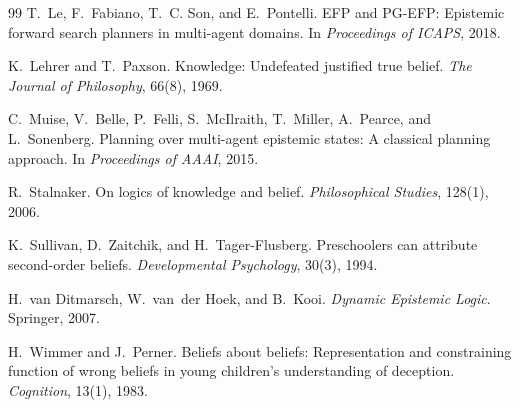 \documentclass[11pt,a4paper]{article}
\begin{document}
\begin{thebibliography}{99}
T.~Le, F.~Fabiano, T.~C. Son, and E.~Pontelli.
\newblock EFP and PG-EFP: Epistemic forward search planners in multi-agent domains.
\newblock In \emph{Proceedings of ICAPS}, 2018.

K.~Lehrer and T.~Paxson.
\newblock Knowledge: Undefeated justified true belief.
\newblock \emph{The Journal of Philosophy}, 66(8), 1969.

C.~Muise, V.~Belle, P.~Felli, S.~McIlraith, T.~Miller, A.~Pearce, and L.~Sonenberg.
\newblock Planning over multi-agent epistemic states: A classical planning approach.
\newblock In \emph{Proceedings of AAAI}, 2015.

R.~Stalnaker.
\newblock On logics of knowledge and belief.
\newblock \emph{Philosophical Studies}, 128(1), 2006.

K.~Sullivan, D.~Zaitchik, and H.~Tager-Flusberg.
\newblock Preschoolers can attribute second-order beliefs.
\newblock \emph{Developmental Psychology}, 30(3), 1994.

H.~van Ditmarsch, W.~van~der Hoek, and B.~Kooi.
\newblock \emph{Dynamic Epistemic Logic}.
\newblock Springer, 2007.

H.~Wimmer and J.~Perner.
\newblock Beliefs about beliefs: Representation and constraining function of wrong beliefs in
young children's understanding of deception.
\newblock \emph{Cognition}, 13(1), 1983.

\end{thebibliography}
\end{document}
